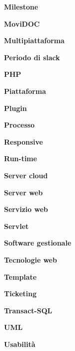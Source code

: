 \textbf{Milestone}

\textbf{MoviDOC}

\textbf{Multipiattaforma}

\textbf{Periodo di slack}

\textbf{PHP}

\textbf{Piattaforma}

\textbf{Plugin}

\textbf{Processo}

\textbf{Responsive}

\textbf{Run-time}

\textbf{Server cloud}

\textbf{Server web}

\textbf{Servizio web}

\textbf{Servlet}

\textbf{Software gestionale}

\textbf{Tecnologie web}

\textbf{Template}

\textbf{Ticketing}

\textbf{Transact-SQL}

\textbf{UML}

\textbf{Usabilità}